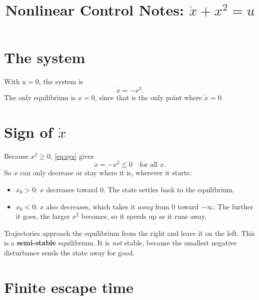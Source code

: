 \documentclass[11pt]{article}
\title{Nonlinear Control Notes: $\dot{x} + x^2 = u$}
\author{}
\date{}
\begin{document}
\maketitle

\section*{The system}
With $u = 0$, the system is
\begin{equation}
  \dot{x} = -x^2 .
  \label{eq:sys}
\end{equation}
The only equilibrium is $x = 0$, since that is the only point where $\dot{x} = 0$.

\section*{Sign of $\dot{x}$}
Because $x^2 \ge 0$, \eqref{eq:sys} gives
\begin{equation}
  \dot{x} = -x^2 \le 0 \quad \text{for all } x .
  \label{eq:sign}
\end{equation}
So $x$ can only decrease or stay where it is, wherever it starts:
\begin{itemize}
  \item $x_0 > 0$: $x$ decreases toward $0$. The state settles back to the equilibrium.
  \item $x_0 < 0$: $x$ also decreases, which takes it \emph{away} from $0$ toward $-\infty$. The further it goes, the larger $x^2$ becomes, so it speeds up as it runs away.
\end{itemize}

\begin{center}
\end{center}

Trajectories approach the equilibrium from the right and leave it on the left. This is a \textbf{semi-stable} equilibrium. It is \emph{not} stable, because the smallest negative disturbance sends the state away for good.

\section*{Finite escape time}
\end{document}
